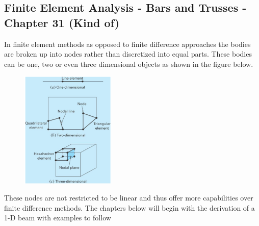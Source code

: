 \subsection{Finite Element Analysis - Bars and Trusses - Chapter 31
  (Kind of)}

In finite element methods as opposed to finite difference approaches
the bodies are broken up into nodes rather than discretized into equal
parts. These bodies can be one, two or even three dimensional objects
as shown in the figure below.

\begin{figure}[H]
  \begin{center}
    \includegraphics[height=0.5\textwidth,width=0.4\textwidth]{Graphics/cha9792x_3102_lg.png}
  \end{center}
\end{figure}

These nodes are not restricted to be linear and thus offer more
capabilities over finite difference methods. The chapters below will
begin with the derivation of a 1-D beam with examples to follow

